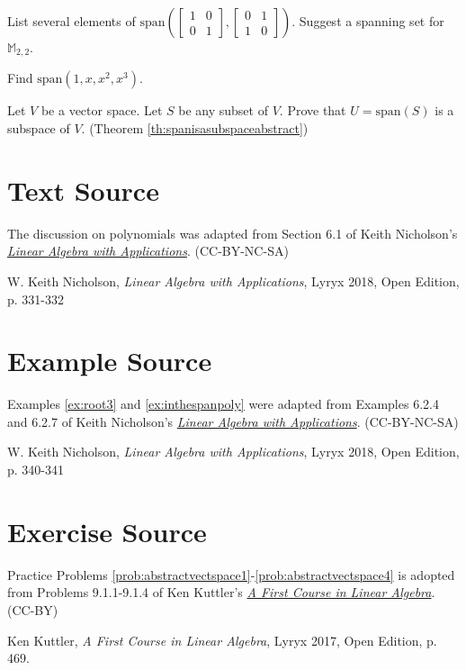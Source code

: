 \documentclass{ximera}
\begin{document}
\begin{problem}\label{prob:abstractvectspace9}
List several elements of $\mbox{span}\left(\begin{bmatrix}1&0\\0&1\end{bmatrix}, \begin{bmatrix}0&1\\1&0\end{bmatrix}\right)$.  Suggest a spanning set for $\mathbb{M}_{2,2}$.
\end{problem}

\begin{problem}\label{prob:abstractvectspace10}
Find $\mbox{span}(1, x, x^2, x^3)$.
\end{problem}

\begin{problem}\label{prob:spanisasubspaceabstract}
Let $V$ be a vector space.  Let $S$ be any subset of $V$.  Prove that $U=\mbox{span}(S)$ is a subspace of $V$. (Theorem \ref{th:spanisasubspaceabstract})
\end{problem}

\section*{Text Source} The discussion on polynomials was adapted from Section 6.1 of Keith Nicholson's \href{https://open.umn.edu/opentextbooks/textbooks/linear-algebra-with-applications}{\it Linear Algebra with Applications}. (CC-BY-NC-SA)

W. Keith Nicholson, {\it Linear Algebra with Applications}, Lyryx 2018, Open Edition, p. 331-332 

\section*{Example Source}
Examples \ref{ex:root3} and \ref{ex:inthespanpoly} were adapted from Examples 6.2.4 and 6.2.7 of Keith Nicholson's \href{https://open.umn.edu/opentextbooks/textbooks/linear-algebra-with-applications}{\it Linear Algebra with Applications}. (CC-BY-NC-SA)

W. Keith Nicholson, {\it Linear Algebra with Applications}, Lyryx 2018, Open Edition, p. 340-341 

\section*{Exercise Source}
Practice Problems \ref{prob:abstractvectspace1}-\ref{prob:abstractvectspace4} is adopted from Problems 9.1.1-9.1.4 of Ken Kuttler's \href{https://open.umn.edu/opentextbooks/textbooks/a-first-course-in-linear-algebra-2017}{\it A First Course in Linear Algebra}. (CC-BY)

Ken Kuttler, {\it  A First Course in Linear Algebra}, Lyryx 2017, Open Edition, p. 469.
\end{document}
